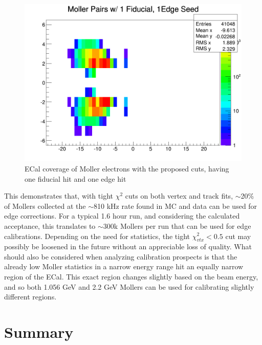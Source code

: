 \documentclass{article}
\begin{document}
	\begin{figure}[H]
  	\includegraphics[width=\linewidth]{PostCollabMeet/Pass3PureMoller/CUT_ECalMollers4Calib.png}
  	\caption{ECal coverage of Moller electrons with the proposed cuts, having one fiducial hit and one edge hit}
  	\label{fig:calibHits}
	\end{figure}
	
	This demonstrates that, with tight $\chi^{2}$ cuts on both vertex and track fits, $\sim$20\% of Mollers collected at the $\sim$810 kHz rate found in MC and data can be used for edge corrections. For a typical 1.6 hour run, and considering the calculated acceptance, this translates to $\sim$300k Mollers per run that can be used for edge calibrations. Depending on the need for statistics, the tight $\chi^{2}_{vtx}<0.5$ cut may possibly be loosened in the future without an appreciable loss of quality. What should also be considered when analyzing calibration prospects is that the already low Moller statistics in a narrow energy range hit an equally narrow region of the ECal. This exact region changes slightly based on the beam energy, and so both 1.056 GeV and 2.2 GeV Mollers can be used for calibrating slightly different regions.
	
	\section{Summary}
\end{document}
